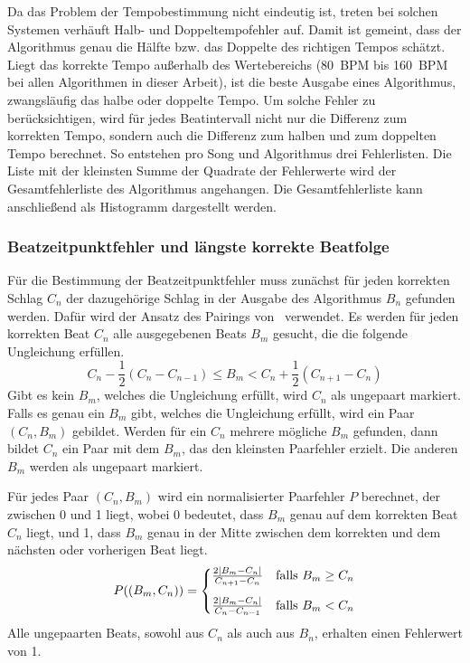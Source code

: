 {{{			%
			Da das Problem der Tempobestimmung nicht eindeutig ist,
				treten bei solchen Systemen verhäuft Halb- und Doppeltempofehler auf.
			Damit ist gemeint,
				dass der Algorithmus genau die Hälfte bzw. das Doppelte des richtigen Tempos schätzt.
			Liegt das korrekte Tempo au{\ss}erhalb des Wertebereichs
				(\SI{80}{\ac{BPM}} bis \SI{160}{\ac{BPM}} bei allen Algorithmen in dieser Arbeit),
				ist die beste Ausgabe eines Algorithmus,
				zwangsläufig das halbe oder doppelte Tempo.
			Um solche Fehler zu berücksichtigen,
				wird für jedes Beatintervall nicht nur die Differenz zum korrekten Tempo,
				sondern auch die Differenz zum halben und zum doppelten Tempo berechnet.
			So entstehen pro Song und Algorithmus drei Fehlerlisten.
			Die Liste mit der kleinsten Summe der Quadrate der Fehlerwerte wird der Gesamtfehlerliste des Algorithmus angehangen.
			Die Gesamtfehlerliste kann anschlie{\ss}end als Histogramm dargestellt werden.
		}

		\subsubsection*{\large Beatzeitpunktfehler und längste korrekte Beatfolge}
		{
			Für die Bestimmung der Beatzeitpunktfehler muss zunächst
				für jeden korrekten Schlag $C_n$ der dazugehörige Schlag in der Ausgabe des Algorithmus $B_n$ gefunden werden.
			Dafür wird der Ansatz des Pairings von~\cite{1997_GoMu1} verwendet.
			Es werden für jeden korrekten Beat $C_n$ alle ausgegebenen Beats $B_m$ gesucht,
				die die folgende Ungleichung erfüllen.
			\begin{equation}
				C_n - \frac{1}{2}(C_n - C_{n - 1}) \le B_m < C_n + \frac{1}{2}(C_{n + 1} - C_n)
			\end{equation}
			Gibt es kein $B_m$,
				welches die Ungleichung erfüllt,
				wird $C_n$ als ungepaart markiert.
			Falls es genau ein $B_m$ gibt,
				welches die Ungleichung erfüllt,
				wird ein Paar $(C_n, B_m)$ gebildet.
			Werden für ein $C_n$ mehrere mögliche $B_m$ gefunden,
				dann bildet $C_n$ ein Paar mit dem $B_m$,
				das den kleinsten Paarfehler erzielt.
			Die anderen $B_m$ werden als ungepaart markiert.

			Für jedes Paar $(C_n, B_m)$ wird ein normalisierter Paarfehler $P$ berechnet,
				der zwischen \num{0} und \num{1} liegt,
				wobei \num{0} bedeutet,
				dass $B_m$ genau auf dem korrekten Beat $C_n$ liegt,
				und \num{1},
				dass $B_m$ genau in der Mitte zwischen dem korrekten und dem nächsten oder vorherigen Beat liegt.
			\begin{equation}
				P((B_m, C_n)) =
					\begin{cases}
						\frac{2|B_m - C_n|}{C_{n + 1} - C_n} & \text{falls } B_m \ge C_n \vspace{3mm} \\
						\frac{2|B_m - C_n|}{C_n - C_{n - 1}} & \text{falls } B_m  <  C_n
					\end{cases}
			\end{equation}
			Alle ungepaarten Beats,
				sowohl aus $C_n$ als auch aus $B_n$,
				erhalten einen Fehlerwert von \num{1}.

}}}
